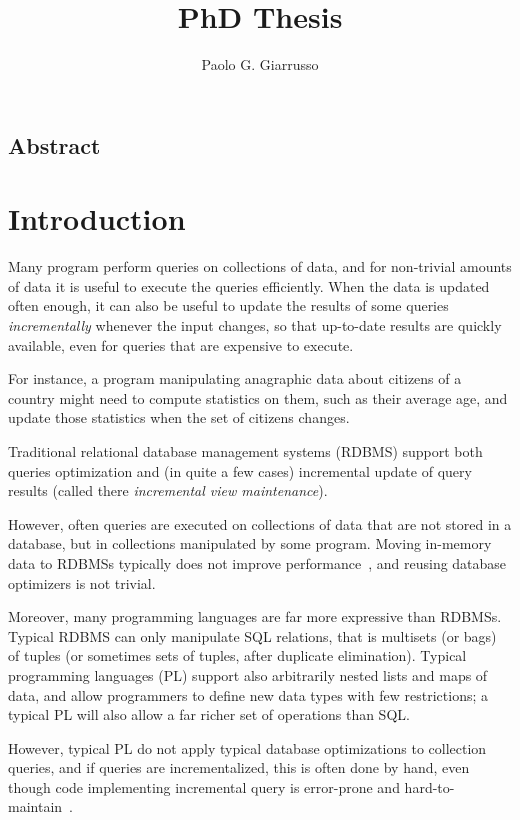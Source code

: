 \documentclass{book}
\title{PhD Thesis}
\author{Paolo G. Giarrusso}
\begin{document}
\maketitle
\section*{Abstract}

\chapter{Introduction}

Many program perform queries on collections of data, and for non-trivial amounts
of data it is useful to execute the queries efficiently. When the data is
updated often enough, it can also be useful to update the results of some
queries \emph{incrementally} whenever the input changes, so that up-to-date
results are quickly available, even for queries that are expensive to execute.

For instance, a program manipulating anagraphic data about citizens of a country
might need to compute statistics on them, such as their average age, and update
those statistics when the set of citizens changes.

Traditional relational database management systems (RDBMS) support both queries
optimization and (in quite a few cases) incremental update of query results
(called there \emph{incremental view maintenance}).

However, often queries are executed on collections of data that are not stored
in a database, but in collections manipulated by some program. Moving in-memory
data to RDBMSs typically does not improve
performance~\citep{Stonebraker07,Rompf2015functional}, and reusing database
optimizers is not trivial.

Moreover, many programming languages are far more expressive than RDBMSs.
Typical RDBMS can only manipulate SQL relations, that is multisets (or bags) of
tuples (or sometimes sets of tuples, after duplicate elimination). Typical
programming languages (PL) support also arbitrarily nested lists and maps of
data, and allow programmers to define new data types with few restrictions; a
typical PL will also allow a far richer set of operations than SQL.

However, typical PL do not apply typical database optimizations to collection
queries, and if queries are incrementalized, this is often done by hand, even
though code implementing incremental query is error-prone and
hard-to-maintain~\citep{Salvaneschi13reactive}.
\end{document}
